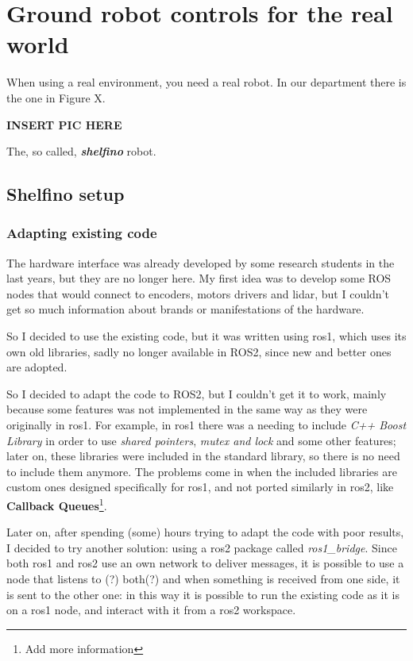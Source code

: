 \chapter{Ground robot controls for the real world}
\label{cha:realworld}

When using a real environment, you need a real robot. In our department there is the one in Figure X.

{\bf INSERT PIC HERE}

The, so called, {\it \textbf {shelfino}} robot.

\section{Shelfino setup}

\subsection{Adapting existing code}

The hardware interface was already developed by some research students in the last years, but they are no longer here. My first idea was to develop some ROS nodes that would connect to encoders, motors drivers and lidar, but I couldn't get so much information about brands or manifestations of the hardware.

So I decided to use the existing code, but it was written using \Acrshort{ros1}, which uses its own old libraries, sadly no longer available in ROS2, since new and better ones are adopted.

So I decided to adapt the code to ROS2, but I couldn't get it to work, mainly because some features was not implemented in the same way as they were originally in \Acrshort{ros1}. For example, in \Acrshort{ros1} there was a needing to include {\it C++ Boost Library} in order to use {\it shared pointers}, {\it mutex and lock} and some other features; later on, these libraries were included in the standard library, so there is no need to include them anymore.
The problems come in when the included libraries are custom ones designed specifically for \Acrshort{ros1}, and not ported similarly in \Acrshort{ros2}, like {\bf Callback Queues}\footnote{Add more information}\cite{migrationguide}.

Later on, after spending (some) hours trying to adapt the code with poor results, I decided to try another solution: using a \Acrshort{ros2} package called {\it ros1\_bridge}. Since both \Acrshort{ros1} and \Acrshort{ros2} use an own network to deliver messages, it is possible to use a node that listens to (?) both(?) and when something is received from one side, it is sent to the other one: in this way it is possible to run the existing code as it is on a \Acrshort{ros1} node, and interact with it from a \Acrshort{ros2} workspace.
